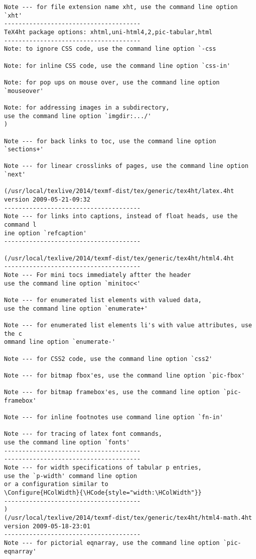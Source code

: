 \begin{Verbatim}[fontsize=\tiny]
Note --- for file extension name xht, use the command line option `xht'
--------------------------------------
TeX4ht package options: xhtml,uni-html4,2,pic-tabular,html
--------------------------------------
Note: to ignore CSS code, use the command line option `-css

Note: for inline CSS code, use the command line option `css-in'

Note: for pop ups on mouse over, use the command line option `mouseover'

Note: for addressing images in a subdirectory, 
use the command line option `imgdir:.../'
)

Note --- for back links to toc, use the command line option `sections+'

Note --- for linear crosslinks of pages, use the command line option `next'

(/usr/local/texlive/2014/texmf-dist/tex/generic/tex4ht/latex.4ht
version 2009-05-21-09:32
--------------------------------------
Note --- for links into captions, instead of float heads, use the command l
ine option `refcaption'
--------------------------------------

(/usr/local/texlive/2014/texmf-dist/tex/generic/tex4ht/html4.4ht
--------------------------------------
Note --- For mini tocs immediately aftter the header 
use the command line option `minitoc<'

Note --- for enumerated list elements with valued data, 
use the command line option `enumerate+'

Note --- for enumerated list elements li's with value attributes, use the c
ommand line option `enumerate-'

Note --- for CSS2 code, use the command line option `css2'

Note --- for bitmap fbox'es, use the command line option `pic-fbox'

Note --- for bitmap framebox'es, use the command line option `pic-framebox'

Note --- for inline footnotes use command line option `fn-in'

Note --- for tracing of latex font commands, 
use the command line option `fonts'
--------------------------------------
--------------------------------------
Note --- for width specifications of tabular p entries, 
use the `p-width' command line option 
or a configuration similar to 
\Configure{HColWidth}{\HCode{style="width:\HColWidth"}}
--------------------------------------
)
(/usr/local/texlive/2014/texmf-dist/tex/generic/tex4ht/html4-math.4ht
version 2009-05-18-23:01
--------------------------------------
Note --- for pictorial eqnarray, use the command line option `pic-eqnarray'


\end{Verbatim}
